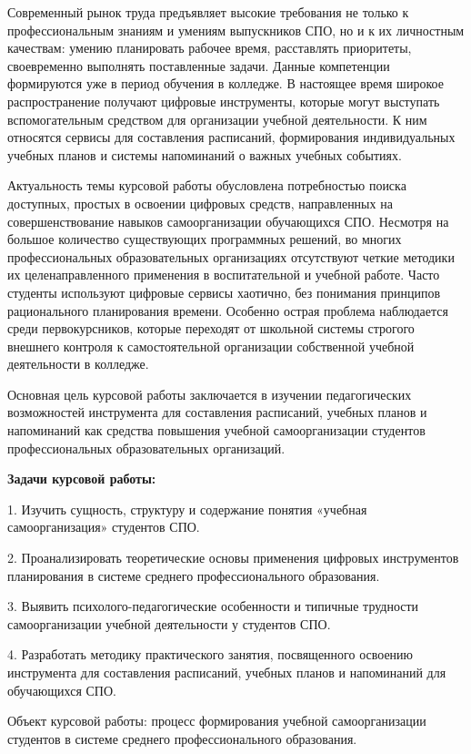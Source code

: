 \documentclass[
]{article}
\begin{document}
Современный рынок труда предъявляет высокие требования не только к
профессиональным знаниям и умениям выпускников СПО, но и к их личностным
качествам: умению планировать рабочее время, расставлять приоритеты,
своевременно выполнять поставленные задачи. Данные компетенции
формируются уже в период обучения в колледже. В настоящее время широкое
распространение получают цифровые инструменты, которые могут выступать
вспомогательным средством для организации учебной деятельности. К ним
относятся сервисы для составления расписаний, формирования
индивидуальных учебных планов и системы напоминаний о важных учебных
событиях.

Актуальность темы курсовой работы обусловлена потребностью поиска
доступных, простых в освоении цифровых средств, направленных на
совершенствование навыков самоорганизации обучающихся СПО. Несмотря на
большое количество существующих программных решений, во многих
профессиональных образовательных организациях отсутствуют четкие
методики их целенаправленного применения в воспитательной и учебной
работе. Часто студенты используют цифровые сервисы хаотично, без
понимания принципов рационального планирования времени. Особенно острая
проблема наблюдается среди первокурсников, которые переходят от школьной
системы строгого внешнего контроля к самостоятельной организации
собственной учебной деятельности в колледже.

Основная цель курсовой работы заключается в изучении педагогических
возможностей инструмента для составления расписаний, учебных планов и
напоминаний как средства повышения учебной самоорганизации студентов
профессиональных образовательных организаций.

\textbf{Задачи курсовой работы:}

1. Изучить сущность, структуру и содержание понятия «учебная
самоорганизация» студентов СПО.

2. Проанализировать теоретические основы применения цифровых
инструментов планирования в системе среднего профессионального
образования.

3. Выявить психолого-педагогические особенности и типичные трудности
самоорганизации учебной деятельности у студентов СПО.

4. Разработать методику практического занятия, посвященного освоению
инструмента для составления расписаний, учебных планов и напоминаний для
обучающихся СПО.

Объект курсовой работы: процесс формирования учебной самоорганизации
студентов в системе среднего профессионального образования.
\end{document}
